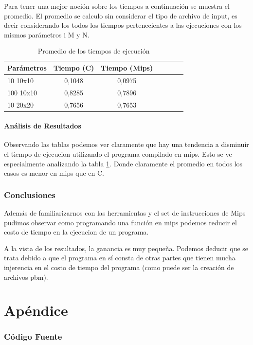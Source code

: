 \documentclass[11pt,a4paper]{article}
\begin{document}
Para tener una mejor noción sobre los tiempos a continuación se muestra el promedio. El promedio se calculo sin considerar el tipo de archivo de input, es decir considerando los todos los tiempos pertenecientes a las ejecuciones con los mismos parámetros i M y N.

\begin{table}[h]
	\centering
	\begin{tabular}{|l|c|c|c|c|c|c|}
	\hline
	\textbf{Parámetros}&\textbf{Tiempo (C)}&\textbf{ Tiempo (Mips)}\\
	\hline
	10 10x10 &	0,1048&	0,0975\\
	\hline
	100 10x10&	0,8285&	0,7896\\
	\hline
	10 20x20 &	0,7656&	0,7653\\		
	\hline
	\end{tabular}
	\caption{Promedio de los tiempos de ejecución}
	\label{tab:prom}
\end{table}

\subsection{Análisis de Resultados}
Observando las tablas podemos ver claramente que hay una tendencia a disminuir el tiempo de ejecucion utilizando el programa compilado en mips. Esto se ve especialmente analizando la tabla \ref{tab:prom}. Donde claramente el promedio en todos los casos es menor en mips que en C.

\section{Conclusiones}
Además de familiarizarnos con las herramientas y el set de instrucciones de Mips pudimos observar como programando una función en mips podemos reducir el costo de tiempo en la ejecucion de un programa.

A la vista de los resultados, la ganancia es muy pequeña. Podemos deducir que se trata debido a que el programa en sí consta de otras partes que tienen mucha injerencia en el costo de tiempo del programa (como puede ser la creación de archivos pbm). 

\appendix
\part*{Apéndice}
\section{Código Fuente}
\end{document}
